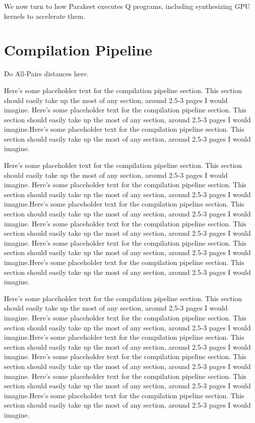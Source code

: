 \documentclass[preprint]{sigplanconf}
\begin{document}
We now turn to how Parakeet executes Q programs, including synthesizing GPU
kernels to accelerate them.

\section{Compilation Pipeline}
\label{Compilation}

Do All-Pairs distances here.

Here's some placeholder text for the compilation pipeline section.  This
section should easily take up the most of any section, around 2.5-3 pages I
would imagine.
Here's some placeholder text for the compilation pipeline section.  This
section should easily take up the most of any section, around 2.5-3 pages I
would imagine.Here's some placeholder text for the compilation pipeline section.
 This
section should easily take up the most of any section, around 2.5-3 pages I
would imagine.

Here's some placeholder text for the compilation pipeline section.  This
section should easily take up the most of any section, around 2.5-3 pages I
would imagine.
Here's some placeholder text for the compilation pipeline section.  This
section should easily take up the most of any section, around 2.5-3 pages I
would imagine.Here's some placeholder text for the compilation pipeline section.
 This
section should easily take up the most of any section, around 2.5-3 pages I
would imagine.
Here's some placeholder text for the compilation pipeline section.  This
section should easily take up the most of any section, around 2.5-3 pages I
would imagine.
Here's some placeholder text for the compilation pipeline section.  This
section should easily take up the most of any section, around 2.5-3 pages I
would imagine.Here's some placeholder text for the compilation pipeline section.
 This
section should easily take up the most of any section, around 2.5-3 pages I
would imagine.

Here's some placeholder text for the compilation pipeline section.  This
section should easily take up the most of any section, around 2.5-3 pages I
would imagine.
Here's some placeholder text for the compilation pipeline section.  This
section should easily take up the most of any section, around 2.5-3 pages I
would imagine.Here's some placeholder text for the compilation pipeline section.
 This
section should easily take up the most of any section, around 2.5-3 pages I
would imagine.
Here's some placeholder text for the compilation pipeline section.  This
section should easily take up the most of any section, around 2.5-3 pages I
would imagine.
Here's some placeholder text for the compilation pipeline section.  This
section should easily take up the most of any section, around 2.5-3 pages I
would imagine.Here's some placeholder text for the compilation pipeline section.
 This
section should easily take up the most of any section, around 2.5-3 pages I
would imagine.
\end{document}
